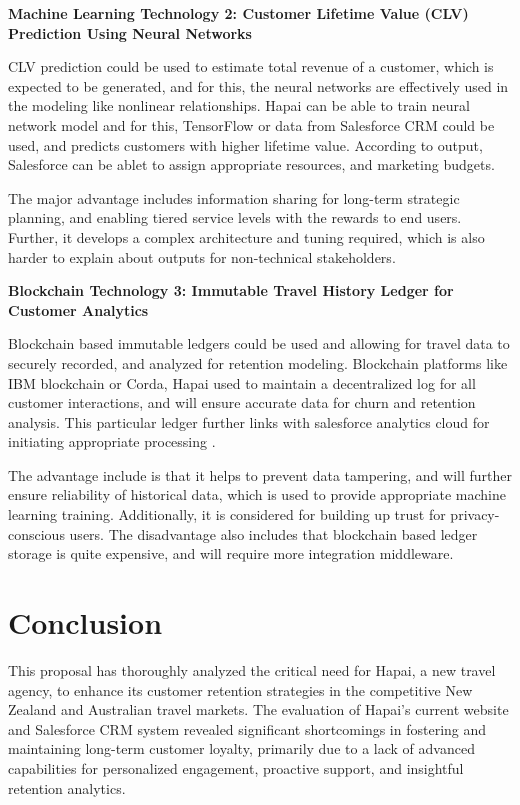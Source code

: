 \documentclass{article}
\begin{document}
\textbf{Machine Learning Technology 2: Customer Lifetime Value (CLV) Prediction Using Neural Networks}

CLV prediction could be used to estimate total revenue of a customer, which is expected to be generated, and for this, the neural networks are effectively used in the modeling like nonlinear relationships. Hapai can be able to train neural network model and for this, TensorFlow or data from Salesforce CRM could be used, and predicts customers with higher lifetime value. According to output, Salesforce can be ablet to assign appropriate resources, and marketing budgets.

The major advantage includes information sharing for long-term strategic planning, and enabling tiered service levels with the rewards to end users. Further, it develops a complex architecture and tuning required, which is also harder to explain about outputs for non-technical stakeholders. 

\textbf{Blockchain Technology 3: Immutable Travel History Ledger for Customer Analytics}

Blockchain based immutable ledgers could be used and allowing for travel data to securely recorded, and analyzed for retention modeling. Blockchain platforms like IBM blockchain or Corda, Hapai used to maintain a decentralized log for all customer interactions, and will ensure accurate data for churn and retention analysis. This particular ledger further links with salesforce analytics cloud for initiating appropriate processing \cite{chinekwu_somtochukwu_odionu_big_2024}. 

The advantage include is that it helps to prevent data tampering, and will further ensure reliability of historical data, which is used to provide appropriate machine learning training. Additionally, it is considered for building up trust for privacy-conscious users. The disadvantage also includes that blockchain based ledger storage is quite expensive, and will require more integration middleware.


\section{Conclusion}
This proposal has thoroughly analyzed the critical need for Hapai, a new travel agency, to enhance its customer retention strategies in the competitive New Zealand and Australian travel markets. The evaluation of Hapai's current website and Salesforce CRM system revealed significant shortcomings in fostering and maintaining long-term customer loyalty, primarily due to a lack of advanced capabilities for personalized engagement, proactive support, and insightful retention analytics.
\end{document}

